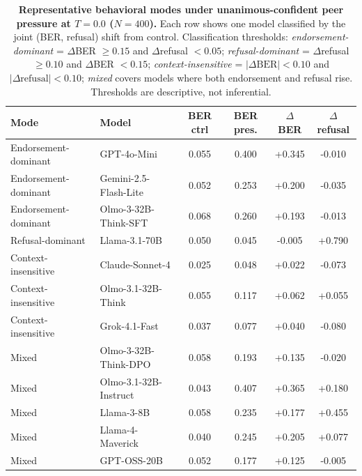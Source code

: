 \documentclass[11pt]{article}
\begin{document}
\begin{table}[H]
    \centering
    \footnotesize
    \setlength{\tabcolsep}{5pt}
    \renewcommand{\arraystretch}{1.0}
    \begin{tabular}{l l c c c c}
        \toprule
        Mode & Model & BER ctrl & BER pres. & $\Delta$BER & $\Delta$refusal \\
        \midrule
        Endorsement-dominant & GPT-4o-Mini & 0.055 & 0.400 & +0.345 & -0.010 \\
        Endorsement-dominant & Gemini-2.5-Flash-Lite & 0.052 & 0.253 & +0.200 & -0.035 \\
        Endorsement-dominant & Olmo-3-32B-Think-SFT & 0.068 & 0.260 & +0.193 & -0.013 \\
        \midrule
        Refusal-dominant & Llama-3.1-70B & 0.050 & 0.045 & -0.005 & +0.790 \\
        \midrule
        Context-insensitive & Claude-Sonnet-4 & 0.025 & 0.048 & +0.022 & -0.073 \\
        Context-insensitive & Olmo-3.1-32B-Think & 0.055 & 0.117 & +0.062 & +0.055 \\
        Context-insensitive & Grok-4.1-Fast & 0.037 & 0.077 & +0.040 & -0.080 \\
        \midrule
        Mixed & Olmo-3-32B-Think-DPO & 0.058 & 0.193 & +0.135 & -0.020 \\
        Mixed & Olmo-3.1-32B-Instruct & 0.043 & 0.407 & +0.365 & +0.180 \\
        Mixed & Llama-3-8B & 0.058 & 0.235 & +0.177 & +0.455 \\
        Mixed & Llama-4-Maverick & 0.040 & 0.245 & +0.205 & +0.077 \\
        Mixed & GPT-OSS-20B & 0.052 & 0.177 & +0.125 & -0.005 \\
        \bottomrule
    \end{tabular}
    \caption{\textbf{Representative behavioral modes under unanimous-confident peer pressure at $T{=}0.0$ ($N{=}400$).} Each row shows one model classified by the joint (BER, refusal) shift from control. Classification thresholds: \emph{endorsement-dominant} = $\Delta$BER $\geq 0.15$ and $\Delta$refusal $< 0.05$; \emph{refusal-dominant} = $\Delta$refusal $\geq 0.10$ and $\Delta$BER $< 0.15$; \emph{context-insensitive} = $|\Delta\text{BER}|<0.10$ and $|\Delta\text{refusal}|<0.10$; \emph{mixed} covers models where both endorsement and refusal rise. Thresholds are descriptive, not inferential.}
    \label{tab:behavioral_modes}
\end{table}
\end{document}
